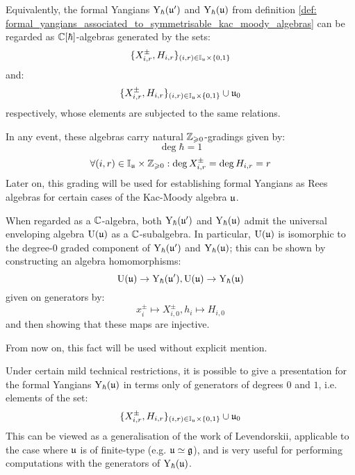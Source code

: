         \begin{remark} \label{remark: positive_Z_grading_on_formal_yangians}
            Equivalently, the formal Yangians $\mathrm{Y}_{\hbar}(\mathfrak{u}')$ and $\mathrm{Y}_{\hbar}(\mathfrak{u})$ from definition \ref{def: formal_yangians_associated_to_symmetrisable_kac_moody_algebras} can be regarded as $\mathbb{C}[\hbar]$-algebras generated by the sets:
                $$\{X_{i, r}^{\pm}, H_{i, r}\}_{(i, r) \in \simpleroots_{\fraku} \x \{0, 1\}}$$
            and:
                $$\{X_{i, r}^{\pm}, H_{i, r}\}_{(i, r) \in \simpleroots_{\fraku} \x \{0, 1\}} \cup \fraku_0$$
            respectively, whose elements are subjected to the same relations.

            In any event, these algebras carry natural $\mathbb{Z}_{\geqslant 0}$-gradings given by:
                $$\deg \hbar = 1$$
                $$\forall (i, r) \in \simpleroots_{\fraku} \x \Z_{\geq 0}: \deg X^{\pm}_{i, r} = \deg H_{i, r} = r$$
            Later on, this grading will be used for establishing formal Yangians as Rees algebras for certain cases of the Kac-Moody algebra $\mathfrak{u}$.
        \end{remark}
        \begin{remark} \label{remark: universal_enveloping_algebras_inside_yangians}
            When regarded as a $\mathbb{C}$-algebra, both $\mathrm{Y}_{\hbar}(\mathfrak{u}')$ and $\mathrm{Y}_{\hbar}(\mathfrak{u})$ admit the universal enveloping algebra $\mathrm{U}(\mathfrak{u})$ as a $\mathbb{C}$-subalgebra. In particular, $\mathrm{U}(\mathfrak{u})$ is isomorphic to the degree-$0$ graded component of $\mathrm{Y}_{\hbar}(\mathfrak{u}')$ and $\mathrm{Y}_{\hbar}(\mathfrak{u})$; this can be shown by constructing an algebra homomorphisms:
                $$\mathrm{U}(\mathfrak{u}) \to \mathrm{Y}_{\hbar}(\mathfrak{u}'), \mathrm{U}(\mathfrak{u}) \to \mathrm{Y}_{\hbar}(\mathfrak{u})$$
            given on generators by:
                $$x_i^{\pm} \mapsto X_{i, 0}^{\pm}, h_i \mapsto H_{i, 0}$$
            and then showing that these maps are injective. 

            From now on, this fact will be used without explicit mention.
        \end{remark}

        Under certain mild technical restrictions, it is possible to give a presentation for the formal Yangians $\mathrm{Y}_{\hbar}(\mathfrak{u})$ in terms only of generators of degrees $0$ and $1$, i.e. elements of the set:
            $$\{X_{i, r}^{\pm}, H_{i, r}\}_{(i, r) \in \simpleroots_{\fraku} \x \{0, 1\}} \cup \fraku_0$$
        This can be viewed as a generalisation of the work \cite{levendorskii_finite_type_yangians_presentation} of Levendorskii, applicable to the case where $\mathfrak{u}$ is of finite-type (e.g. $\mathfrak{u} \simeq \mathfrak{g}$), and is very useful for performing computations with the generators of $\mathrm{Y}_{\hbar}(\mathfrak{u})$.
        
